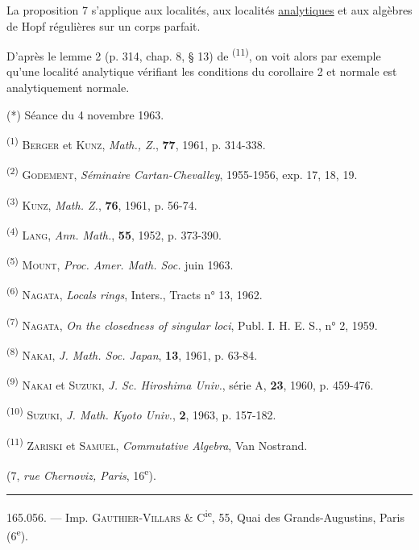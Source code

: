 La proposition 7 s'applique aux localités, aux localités \uline{analytiques} et aux algèbres de Hopf régulières sur un corps parfait.

D'après le lemme 2 (p. 314, chap. 8, § 13) de \textsuperscript{(11)}, on voit alors par exemple qu'une localité analytique vérifiant les conditions du corollaire 2 et normale est analytiquement normale.

(*) Séance du 4 novembre 1963.

\textsuperscript{(1)} \textsc{Berger} et \textsc{Kunz}, \textit{Math., Z.}, \textbf{77}, 1961, p. 314-338.

\textsuperscript{(2)} \textsc{Godement}, \textit{Séminaire Cartan-Chevalley}, 1955-1956, exp. 17, 18, 19.

\textsuperscript{(3)} \textsc{Kunz}, \textit{Math. Z.}, \textbf{76}, 1961, p. 56-74.

\textsuperscript{(4)} \textsc{Lang}, \textit{Ann. Math.}, \textbf{55}, 1952, p. 373-390.

\textsuperscript{(5)} \textsc{Mount}, \textit{Proc. Amer. Math. Soc.} juin 1963.

\textsuperscript{(6)} \textsc{Nagata}, \textit{Locals rings}, Inters., Tracts n° 13, 1962.

\textsuperscript{(7)} \textsc{Nagata}, \textit{On the closedness of singular loci}, Publ. I. H. E. S., n° 2, 1959.

\textsuperscript{(8)} \textsc{Nakai}, \textit{J. Math. Soc. Japan}, \textbf{13}, 1961, p. 63-84.

\textsuperscript{(9)} \textsc{Nakai} et \textsc{Suzuki}, \textit{J. Sc. Hiroshima Univ.}, série A, \textbf{23}, 1960, p. 459-476.

\textsuperscript{(10)} \textsc{Suzuki}, \textit{J. Math. Kyoto Univ.}, \textbf{2}, 1963, p. 157-182.

\textsuperscript{(11)} \textsc{Zariski} et \textsc{Samuel}, \textit{Commutative Algebra}, Van Nostrand.

\hfill (7, \textit{rue Chernoviz, Paris}, 16\textsuperscript{e}).


\hrule
165.056. --- Imp. \textsc{Gauthier-Villars} \& C\textsuperscript{ie}, 55, Quai des Grands-Augustins, Paris (6\textsuperscript{e}).

